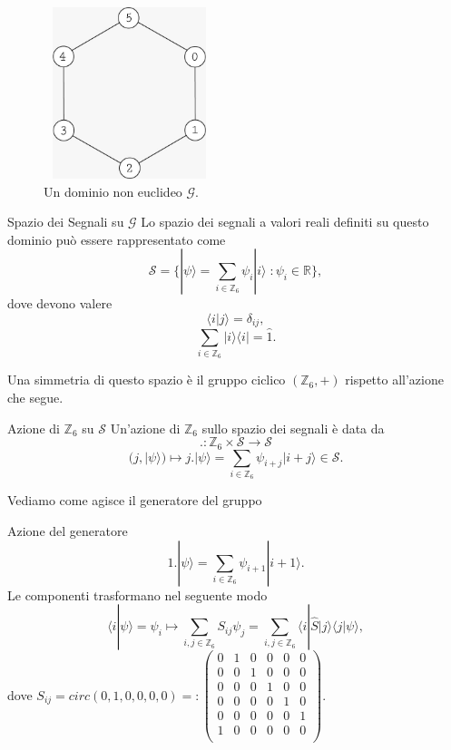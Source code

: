 \documentclass[xcolor=dvipsnames]{beamer}
\newcommand{\R}{\mathbb{R}}
\newcommand{\Z}{\mathbb{Z}}
\newcommand{\mc}[1]{\mathcal{#1}}
\begin{document}
\begin{frame}
    \begin{figure}[H]
        \centering
        \includegraphics[width=5cm, height=5cm]{graph}
        \caption{Un dominio non euclideo $\mc{G}$.}
    \end{figure}    
\end{frame}

\begin{frame}
    \begin{block}{Spazio dei Segnali su $\mc{G}$}
        Lo spazio dei segnali a valori reali definiti su questo dominio può essere rappresentato come
        \[ \mc{S} =\{ | \psi \rangle =  \sum_{i \in \Z_6} \psi_i | i \rangle \; : \psi_i \in \R \} ,\] 
        dove devono valere 
        \[ \langle i | j \rangle = \delta_{ij}, \] 
        \[ \sum_{i \in \Z_6} | i \rangle \langle i | = \widehat{1} .\]      
    \end{block}
\end{frame}

\begin{frame}
    Una simmetria di questo spazio è il gruppo ciclico $(\Z_6,+)$ rispetto all'azione che segue.
    \begin{block}{Azione di $\Z_6$ su $\mc{S}$ }
        Un'azione di $\Z_6$ sullo spazio dei segnali è data da
        \[ . : \Z_6 \times \mc{S} \to \mc{S}\] \[ (j,| \psi \rangle) \mapsto j.| \psi \rangle = \sum_{i \in \Z_6} \psi_{i + j} | i + j \rangle \in \mc{S} .\]        
    \end{block}   
\end{frame}

\begin{frame}
Vediamo come agisce il generatore del gruppo
    \begin{block}{Azione del generatore}
        \[ 1.| \psi \rangle = \sum_{i \in \Z_6} \psi_{i + 1} | i + 1 \rangle.\]
        Le componenti trasformano nel seguente modo
        \[ \langle i | \psi \rangle =  \psi_i \mapsto \sum_{i,j \in \Z_6} S_{ij} \psi_j = \sum_{i,j \in \Z_6} \langle i | \widehat{S} | j \rangle  \langle j | \psi \rangle, \]
        dove $ S_{ij} = circ(0,1,0,0,0,0) =: \begin{pmatrix} 0 & 1 & 0 & 0 & 0 & 0 \\ 0 & 0 & 1 & 0 & 0 & 0 \\ 0 & 0 & 0 & 1 & 0 & 0
        \\ 0 & 0 & 0 & 0 & 1 & 0 \\ 0 & 0 & 0 & 0 & 0 & 1 \\ 1 & 0 & 0 & 0 & 0 & 0 \\ 
    \end{pmatrix} $.
    \end{block}    
\end{frame}
\end{document}

